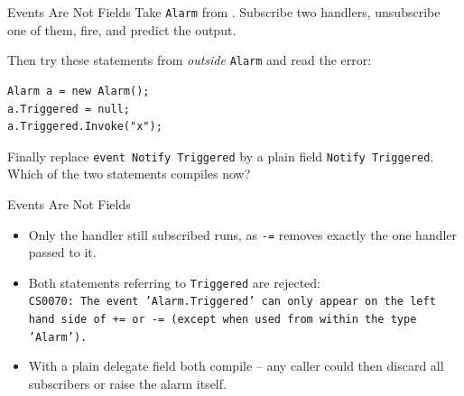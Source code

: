 \begin{exerciseframe}{Events Are Not Fields}
  Take \texttt{Alarm} from . Subscribe two handlers,
  unsubscribe one of them, fire, and predict the output.
  \vspace{1ex}

  Then try these statements from \emph{outside} \texttt{Alarm} and read the error:
  \vspace{1ex}

  \begin{lstlisting}[basicstyle=\scriptsize\ttfamily]
Alarm a = new Alarm();
a.Triggered = null;
a.Triggered.Invoke("x");
  \end{lstlisting}
  \vspace{1ex}

  Finally replace \texttt{event Notify Triggered} by a plain field
  \texttt{Notify Triggered}. Which of the two statements compiles now?
\end{exerciseframe}

\begin{solutionframe}{Events Are Not Fields}
  \begin{itemize}
    \item Only the handler still subscribed runs, as \texttt{-=} removes
      exactly the one handler passed to it.
    \item Both statements referring to \texttt{Triggered} are rejected:\\
     \texttt{CS0070: The event 'Alarm.Triggered' can only appear on the left hand side of += or -=
      (except when used from within the type 'Alarm').}
    \item With a plain delegate field both compile -- any caller could then
      discard all subscribers or raise the alarm itself.
  \end{itemize}
  \vspace{3ex}

\end{solutionframe}

